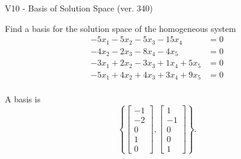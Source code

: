 \begin{exercise}
  \begin{exerciseTitle}V10 - Basis of Solution Space (ver. 340)\end{exerciseTitle}
  \begin{exerciseStatement}
    Find a basis for the solution space of the homogeneous system 
\begin{align*}
 -5 x_ 1 -5 x_ 2 -5 x_ 3 -15 x_ 4 &= 0  \\ 
  -4 x_ 2 -2 x_ 3 -8 x_ 4 -4 x_ 5 &= 0  \\ 
  -3 x_ 1 + 2 x_ 2 -3 x_ 3 + 1 x_ 4 + 5 x_ 5 &= 0  \\ 
  -5 x_ 1 + 4 x_ 2 + 4 x_ 3 + 3 x_ 4 + 9 x_ 5 &= 0  \\ 
 \end{align*}


 
  \end{exerciseStatement}

  \begin{exerciseAnswer}
   A basis is   
\[\left\{\left[\begin{array}{c}
-1 \\
-2 \\
0 \\
1 \\
0
\end{array}\right] , \left[\begin{array}{c}
1 \\
-1 \\
0 \\
0 \\
1
\end{array}\right]\right\}.\]

  


  \end{exerciseAnswer}
\end{exercise}